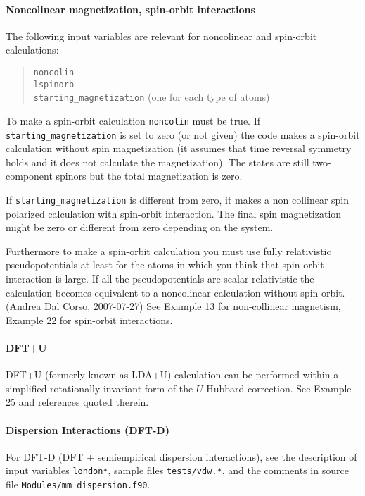 \documentclass[12pt,a4paper]{article}
\begin{document}
\paragraph{Noncolinear magnetization, spin-orbit interactions}

The following input variables are relevant for noncolinear and
spin-orbit calculations: 
\begin{quote}
      \texttt{noncolin}\\
      \texttt{lspinorb}\\
      \texttt{starting\_magnetization} (one for each type of atoms)
\end{quote}
To make a spin-orbit calculation \texttt{noncolin} must be true. 
If \texttt{starting\_magnetization} is set to zero (or not given) 
the code makes a spin-orbit calculation without spin magnetization 
(it assumes that time reversal symmetry holds and it does not calculate 
the magnetization). The states are still two-component spinors but the
total magnetization is zero. 

If \texttt{starting\_magnetization} is different from zero, it makes a non
collinear spin polarized calculation with spin-orbit interaction. The 
final spin magnetization might be zero or different from zero depending 
on the system. 

Furthermore to make a spin-orbit calculation you must use fully
relativistic pseudopotentials at least for the atoms in which you
think that spin-orbit interaction is large. If all the pseudopotentials 
are scalar
relativistic the calculation becomes equivalent to a noncolinear
calculation without spin orbit. (Andrea Dal Corso, 2007-07-27)
See Example 13 for non-collinear magnetism, Example 22
for spin-orbit interactions.

\paragraph{DFT+U}
DFT+U (formerly known as LDA+U) calculation can be
performed within a simplified rotationally invariant form 
of the $U$ Hubbard correction. See Example 25 and references 
quoted therein.

\paragraph{Dispersion Interactions (DFT-D)}
For DFT-D (DFT + semiempirical dispersion interactions), see the
description of input variables \texttt{london*}, sample files
\texttt{tests/vdw.*}, and the comments in source file
\texttt{Modules/mm\_dispersion.f90}.
\end{document}
